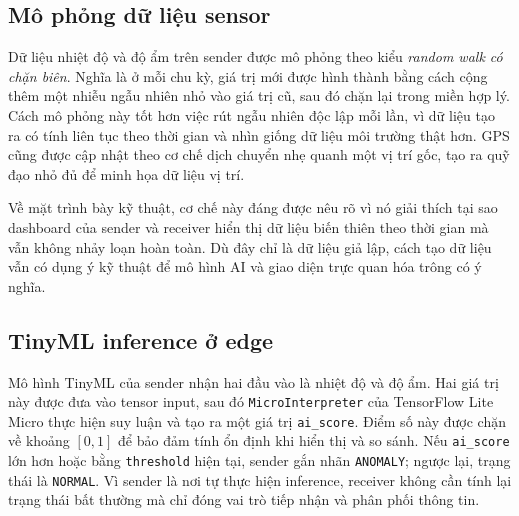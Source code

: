 \documentclass[12pt,a4paper]{report}
\begin{document}
\subsection{Mô phỏng dữ liệu sensor}
Dữ liệu nhiệt độ và độ ẩm trên sender được mô phỏng theo kiểu \textit{random walk có chặn biên}. Nghĩa là ở mỗi chu kỳ, giá trị mới được hình thành bằng cách cộng thêm một nhiễu ngẫu nhiên nhỏ vào giá trị cũ, sau đó chặn lại trong miền hợp lý. Cách mô phỏng này tốt hơn việc rút ngẫu nhiên độc lập mỗi lần, vì dữ liệu tạo ra có tính liên tục theo thời gian và nhìn giống dữ liệu môi trường thật hơn. GPS cũng được cập nhật theo cơ chế dịch chuyển nhẹ quanh một vị trí gốc, tạo ra quỹ đạo nhỏ đủ để minh họa dữ liệu vị trí.

Về mặt trình bày kỹ thuật, cơ chế này đáng được nêu rõ vì nó giải thích tại sao dashboard của sender và receiver hiển thị dữ liệu biến thiên theo thời gian mà vẫn không nhảy loạn hoàn toàn. Dù đây chỉ là dữ liệu giả lập, cách tạo dữ liệu vẫn có dụng ý kỹ thuật để mô hình AI và giao diện trực quan hóa trông có ý nghĩa.

\subsection{TinyML inference ở edge}
Mô hình TinyML của sender nhận hai đầu vào là nhiệt độ và độ ẩm. Hai giá trị này được đưa vào tensor input, sau đó \texttt{MicroInterpreter} của TensorFlow Lite Micro thực hiện suy luận và tạo ra một giá trị \texttt{ai\_score}. Điểm số này được chặn về khoảng \([0,1]\) để bảo đảm tính ổn định khi hiển thị và so sánh. Nếu \texttt{ai\_score} lớn hơn hoặc bằng \texttt{threshold} hiện tại, sender gắn nhãn \texttt{ANOMALY}; ngược lại, trạng thái là \texttt{NORMAL}. Vì sender là nơi tự thực hiện inference, receiver không cần tính lại trạng thái bất thường mà chỉ đóng vai trò tiếp nhận và phân phối thông tin.
\end{document}
